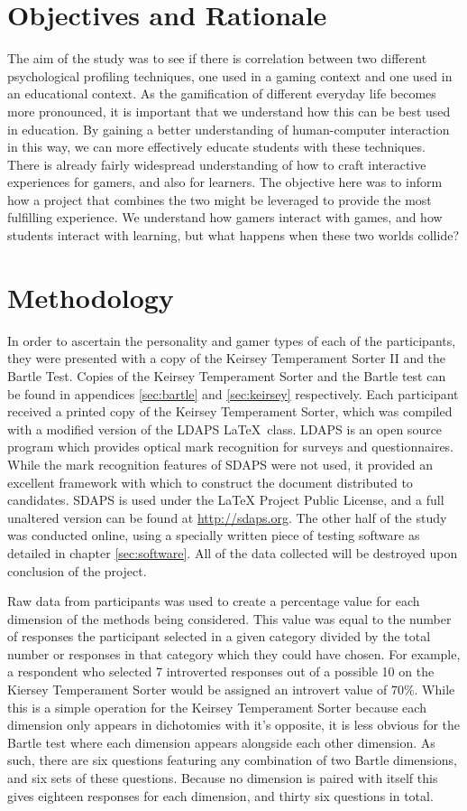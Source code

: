 \documentclass[12pt,a4paper,twoside]{report}
\begin{document}
\section{Objectives and Rationale}
The aim of the study was to see if there is correlation between two different psychological profiling techniques, one used in a gaming context and one used in an educational context. As the gamification of different everyday life becomes more pronounced, it is important that we understand how this can be best used in education. By gaining a better understanding of human-computer interaction in this way, we can more effectively educate students with these techniques. There is already fairly widespread understanding of how to craft interactive experiences for gamers, and also for learners. The objective here was to inform how a project that combines the two might be leveraged to provide the most fulfilling experience. We understand how gamers interact with games, and how students interact with learning, but what happens when these two worlds collide?

\section{Methodology}
In order to ascertain the personality and gamer types of each of the participants, they were presented with a copy of the Keirsey Temperament Sorter II and the Bartle Test. Copies of the Keirsey Temperament Sorter and the Bartle test can be found in appendices \ref{sec:bartle} and \ref{sec:keirsey} respectively. Each participant received a printed copy of the Keirsey Temperament Sorter, which was compiled with a modified version of the LDAPS  \LaTeX \ class. LDAPS is an open source program which provides optical mark recognition for surveys and questionnaires. While the mark recognition features of SDAPS were not used, it provided an excellent framework with which to construct the document distributed to candidates. SDAPS is used under the LaTeX Project Public License, and a full unaltered version can be found at \url{http://sdaps.org}. The other half of the study was conducted online, using a specially written piece of testing software as detailed in chapter \ref{sec:software}. All of the data collected will be destroyed upon conclusion of the project.

Raw data from participants was used to create a percentage value for each dimension of the methods being considered. This value was equal to the number of responses the participant selected in a given category divided by the total number or responses in that category which they could have chosen. For example, a respondent who selected 7 introverted responses out of a possible 10 on the Kiersey Temperament Sorter would be assigned an introvert value of 70\%. While this is a simple operation for the Keirsey Temperament Sorter because each dimension only appears in dichotomies with it's opposite, it is less obvious for the Bartle test where each dimension appears alongside each other dimension. As such, there are six questions featuring any combination of two Bartle dimensions, and six sets of these questions. Because no dimension is paired with itself this gives eighteen responses for each dimension, and thirty six questions in total.
\end{document}
